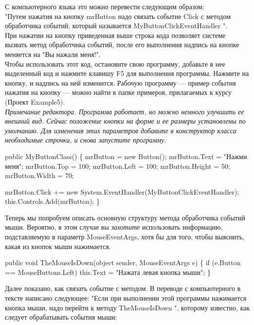 \documentclass[12pt, a4paper]{article}
\begin{document}
С компьютерного языка это можно перевести следующим образом:\\

"Путем нажатия на кнопку mrButton надо связать событие Click  с методом обработчика событий, который называется MyButtonClickEventHandler ".\\

При нажатии на кнопку приведенная выше строка кода позволяет системе вызвать метод обработчика событий, после его выполнения надпись на кнопке меняется на "Вы нажали меня!".\\

Чтобы использовать этот код, остановите свою программу, добавьте в нее выделенный код и нажмите клавишу F5 для выполнения программы. Нажмите на кнопку, и надпись на ней изменится. Рабочую программу — пример события нажатия на кнопку — можно найти в папке примеров, прилагаемых к курсу (Проект Example5).\\


\textit{Примечание редактора. Программа работает, но можно немного улучшить ее внешний вид. Сейчас положение кнопки на форме и ее размеры установлены по умолчанию. Для изменения этих параметров добавьте в конструктор класса необходимые строчки, и снова запустите программу}.
\begin{spverbatim}public MyButtonClass()
    \{
        mrButton = new Button();
        mrButton.Text = "Нажми меня";
        mrButton.Top = 100;
        mrButton.Left = 100;
        mrButton.Height = 50;
        mrButton.Width = 70;
        
        mrButton.Click += new System.EventHandler(MyButtonClickEventHandler);
        this.Controls.Add(mrButton);
    \}\end{spverbatim}

Теперь мы попробуем описать основную структуру метода обработчика событий мыши. Вероятно, в этом случае вы \textit{захотите}  использовать информацию, подставляемую в параметр MouseEventArgs, хотя бы для того, чтобы выяснить, какая из кнопок мыши нажимается.\\

\begin{spverbatim}public void TheMouseIsDown(object sender, MouseEventArgs e)
\{
    if (e.Button == MouseButtons.Left)
        this.Text = "Нажата левая кнопка мыши";
\}\end{spverbatim}

Далее показано, как связать событие с методом. В переводе с компьютерного в тексте написано следующее: "Если при выполнении этой программы нажимается кнопка мыши, надо перейти к методу TheMouseIsDown ", которому известно, как следует обрабатывать события мыши:\\
\end{document}

